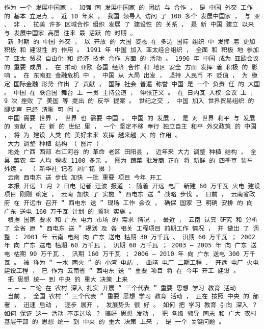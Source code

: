 \documentclass{article}
\begin{document}
\begin{Verbatim}[commandchars=\\\{\}]
 作为 一个 发展中国家 ， 加强 同 发展中国家 的 团结 与 合作 ， 是 中国 外交 工作 的 基本 立足点 。 近 10 年来 ， 我国 领导人 访问 了 100 多个 发展中国家 ， 与 亚 、 非 、 拉美 许多 区域合作 组织 发展 了 建设性 的 关系 ， 是 新 中国 建立 以来 与 发展中国家 高层 往来 最 活跃 的 时期 。 
 新 时期 的 中国 外交 ， 以 开放 的 大国 姿态 在 多边 国际 组织 中 发挥 着 更加 积极 和 建设性 的 作用 。 1991 年 中国 加入 亚太经合组织 ， 全面 和 积极 地 参加 了 亚太 贸易 自由化 和 经济 技术 合作 方面 的 活动 。 1996 年 中国 成为 亚欧会议 的 重要 成员 ， 在 推动 亚欧 各国 经济 合作 和 地区 安全 方面 发挥 着 积极 的 影响 。 在 东南亚 金融危机 中 ， 中国 从 大局 出发 ， 坚持 人民币 不 贬值 ， 为 稳定 国际金融 形势 作出 了 贡献 ， 国际 社会 普遍 称誉 中国 是 一个 负责 任 的 大国 。 中国 在 联合国 舞台 上 一贯 主持公道 ， 伸张正义 。 在 日内瓦 人权 会议 上 ， 9 次 挫败 了 美国 等 提出 的 反华 提案 。 世纪之交 ， 中国 加入 世界贸易组织 的 脚步声 已经 清晰 可 闻 。 
 中国 需要 世界 ， 世界 也 需要 中国 。 中国 的 发展 ， 是 对 世界 和平 与 发展 的 贡献 。 在 新 的 世纪 里 ， 一个 坚定不移 奉行 独立自主 和平 外交政策 的 中国 ， 将 为 建设 人类 的 美好未来 发挥 越来越 大 的 作用 。 
 大力 调整 种植 结构 （ 图片 ） 
 地处 广西 西部 右江河谷 的 革命 老区 田阳县 ， 近年来 大力 调整 种植 结构 ， 全县 菜农 年 人均 增收 1100 多元 。 图为 蔬菜 批发商 正在 将 新鲜 的 四季豆 装车 外运 。 （ 新华社 记者 刘广铭 摄 ） 
 云南 西电东 送 步伐 加快 一批 重要 项目 今年 开工 
 本报 开远 1 月 2 日电 记者 汪波 报道 ： 随着 开远 电厂 新建 60 万千瓦 火电 建设项目 刚刚 确定 ， 云南 加快 了 实施 “ 西电东 送 ” 战略 步伐 。 日前 ， 云南省政府 在 开远市 召开 “ 西电东 送 ” 现场 工作 会议 ， 确保 国家 已 明确 安排 的 向 广东 送电 160 万千瓦 计划 的 顺利 实施 。 
 根据 国家 要求 和 广东 电力 市场 的 需求 情况 ， 最近 ， 云南 认真 研究 和 分析 了 全省 原 “ 西电东 送 ” 规划 及 各 相关 工程项目 前期工作 情况 ， 并 做出 了 调整 ： 2001 年 云南 电网 向 广东 送电 枯期 30 万千瓦 、 汛期 60 万千瓦 ； 2002 年 向 广东 送电 枯期 60 万千瓦 、 汛期 60 万千瓦 ； 2003 — 2005 年 向 广东 送电 枯期 90 万千瓦 、 汛期 160 万千瓦 ； 2006 — 2010 年 向 广东 送电 300 万千瓦 。 被 称为 “ 一水 两火 ” 的 小湾 电站 、 曲靖 电厂 二期工程 、 开远 电厂 火电 建设工程 ， 已 作为 云南省 “ 西电东 送 ” 重要 项目 将 在 今年 开工 建设 。 
 把 思想 统一 到 中央 的 重大 决策 上来 
 — — — 二论 在 农村 深入 扎实 开展 “ 三个代表 ” 重要 思想 学习 教育 活动 
 当前 ， 全国 农村 “ 三个代表 ” 重要 思想 学习 教育 活动 ， 正在 按照 中央 的 部署 ， 迅速 启动 ， 逐步 展开 ， 发展势头 很 好 。 如何 把 学习 教育 引向 深入 ？ 如何 保证 这一 活动 不走过场 ？ 搞好 思想 发动 ， 把 各级 领导 同志 和 广大 农村 基层干部 的 思想 统一 到 中央 的 重大 决策 上来 ， 是 一个 关键问题 。 

\end{Verbatim}
\end{document}
